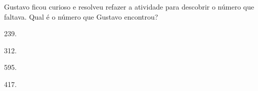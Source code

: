 Gustavo ficou curioso e resolveu refazer a atividade para descobrir o número que faltava. Qual é o número que Gustavo encontrou?

\begin{escolha}
\item
  239.
\item
  312.
\item
  595.
\item
  417.
\end{escolha}



